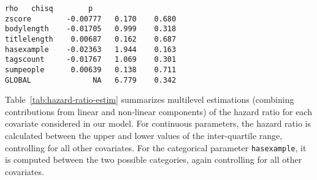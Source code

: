\documentclass{chi2012}
\begin{document}
\begin{lstlisting}[breaklines=true,
caption={Model formulation to fit a Cox PH model for each site using the 
\texttt{cph} function in the \texttt{rms} package in R.},
basicstyle=\ttfamily\scriptsize,
frame=lines,
showtabs=false,
showspaces=false,
showstringspaces=false,
captionpos=b]
                   rho   chisq        p
zscore        -0.00777   0.170    0.680
bodylength    -0.01705   0.999    0.318
titlelength    0.00687   0.162    0.687
hasexample    -0.02363   1.944    0.163
tagscount     -0.01767   1.069    0.301
sumpeople      0.00639   0.138    0.711
GLOBAL              NA   6.779    0.342
\end{lstlisting}

Table~\ref{tab:hazard-ratio-estim} summarizes multilevel estimations (combining
contributions from linear and non-linear components) of the hazard ratio for each 
covariate considered in our model. For continuous parameters, the hazard ratio is 
calculated between the upper and lower values of the inter-quartile range, controlling
for all other covariates. For the categorical parameter \texttt{hasexample}, it is
computed between the two possible categories, again controlling for all
other covariates.
\end{document}
